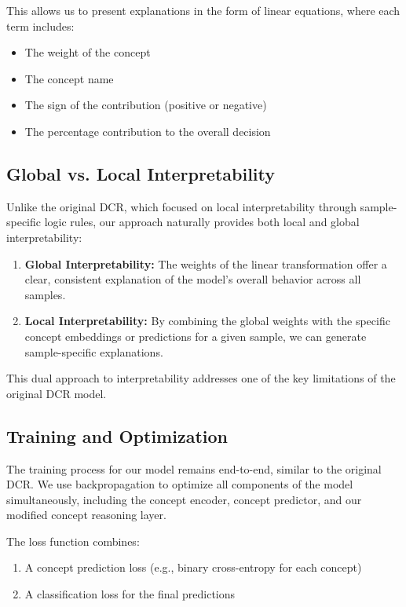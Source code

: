 \documentclass[sigconf, nonacm]{acmart}
\begin{document}
This allows us to present explanations in the form of linear equations, where each term includes:
\begin{itemize}
    \item The weight of the concept
    \item The concept name
    \item The sign of the contribution (positive or negative)
    \item The percentage contribution to the overall decision
\end{itemize}

\subsection{Global vs. Local Interpretability}

Unlike the original DCR, which focused on local interpretability through sample-specific logic rules, our approach naturally provides both local and global interpretability:

\begin{enumerate}
    \item \textbf{Global Interpretability:} The weights of the linear transformation offer a clear, consistent explanation of the model's overall behavior across all samples.
    \item \textbf{Local Interpretability:} By combining the global weights with the specific concept embeddings or predictions for a given sample, we can generate sample-specific explanations.
\end{enumerate}

This dual approach to interpretability addresses one of the key limitations of the original DCR model.

\subsection{Training and Optimization}

The training process for our model remains end-to-end, similar to the original DCR. We use backpropagation to optimize all components of the model simultaneously, including the concept encoder, concept predictor, and our modified concept reasoning layer.

The loss function combines:
\begin{enumerate}
    \item A concept prediction loss (e.g., binary cross-entropy for each concept)
    \item A classification loss for the final predictions
\end{enumerate}
\end{document}
